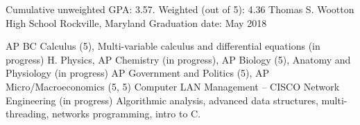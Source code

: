 

\begin{cventries}

  \cventry %
    {Cumulative unweighted GPA: 3.57. Weighted (out of 5): 4.36} %
    {Thomas S. Wootton High School} %
    {Rockville, Maryland} %
    {Graduation date: May 2018} %
    {
    \begin{cvsklist}
    	{ AP BC Calculus (5), Multi-variable calculus and differential equations (in progress)}
        {H. Physics, AP Chemistry (in progress), AP Biology (5), Anatomy and Physiology (in progress)}
        {AP Government and Politics (5), AP Micro/Macroeconomics (5, 5)}
        {Computer LAN Management – CISCO Network Engineering (in progress)}
        {Algorithmic analysis, advanced data structures, multi-threading, networks programming, intro to C.}
    \end{cvsklist}
    }

\end{cventries}

